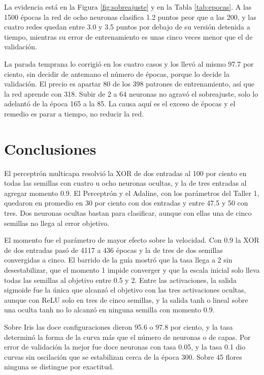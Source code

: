 \documentclass[11pt,letterpaper]{article}
\begin{document}
La evidencia está en la Figura \ref{fig:sobreajuste} y en la Tabla \ref{tab:epocas}. A las 1500 épocas la red de ocho neuronas clasifica 1.2 puntos peor que a las 200, y las cuatro redes quedan entre 3.0 y 3.5 puntos por debajo de su versión detenida a tiempo, mientras su error de entrenamiento es unas cinco veces menor que el de validación.

La parada temprana lo corrigió en los cuatro casos y los llevó al mismo 97.7 por ciento, sin decidir de antemano el número de épocas, porque lo decide la validación. El precio es apartar 80 de los 398 patrones de entrenamiento, así que la red aprende con 318. Subir de 2 a 64 neuronas no agravó el sobreajuste, solo lo adelantó de la época 165 a la 85. La causa aquí es el exceso de épocas y el remedio es parar a tiempo, no reducir la red.

\section{Conclusiones}

El perceptrón multicapa resolvió la XOR de dos entradas al 100 por ciento en todas las semillas con cuatro u ocho neuronas ocultas, y la de tres entradas al agregar momento 0.9. El Perceptrón y el Adaline, con los parámetros del Taller 1, quedaron en promedio en 30 por ciento con dos entradas y entre 47.5 y 50 con tres. Dos neuronas ocultas bastan para clasificar, aunque con ellas una de cinco semillas no llega al error objetivo.

El momento fue el parámetro de mayor efecto sobre la velocidad. Con 0.9 la XOR de dos entradas pasó de 4117 a 436 épocas y la de tres de dos semillas convergidas a cinco. El barrido de la guía mostró que la tasa llega a 2 sin desestabilizar, que el momento 1 impide converger y que la escala inicial solo lleva todas las semillas al objetivo entre 0.5 y 2. Entre las activaciones, la salida sigmoide fue la única que alcanzó el objetivo con las tres activaciones ocultas, aunque con ReLU solo en tres de cinco semillas, y la salida tanh o lineal sobre una oculta tanh no lo alcanzó en ninguna semilla con momento 0.9.

Sobre Iris las doce configuraciones dieron 95.6 o 97.8 por ciento, y la tasa determinó la forma de la curva más que el número de neuronas o de capas. Por error de validación la mejor fue doce neuronas con tasa 0.05, y la tasa 0.1 dio curvas sin oscilación que se estabilizan cerca de la época 300. Sobre 45 flores ninguna se distingue por exactitud.
\end{document}
